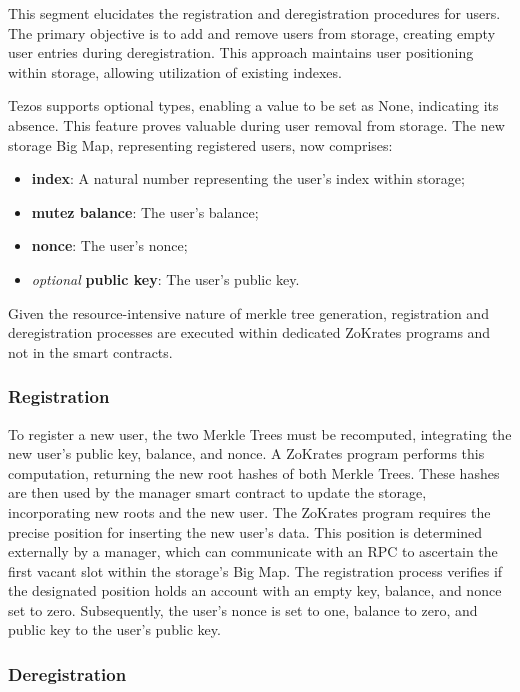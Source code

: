 This segment elucidates the registration and deregistration procedures for users. The primary objective is to add and remove users from storage, creating empty user entries during deregistration. This approach maintains user positioning within storage, allowing utilization of existing indexes.

Tezos supports optional types, enabling a value to be set as None, indicating its absence. This feature proves valuable during user removal from storage. The new storage Big Map, representing registered users, now comprises:
\begin{itemize}
	\item \textbf{index}: A natural number representing the user's index within storage;
	\item \textbf{mutez balance}: The user's balance;
	\item \textbf{nonce}: The user's nonce;
	\item \textit{optional} \textbf{public key}: The user's public key.
\end{itemize}

Given the resource-intensive nature of merkle tree generation, registration and deregistration processes are executed within dedicated ZoKrates programs and not in the smart contracts.

\subsubsection{Registration\label{subsec:registration}}

To register a new user, the two Merkle Trees must be recomputed, integrating the new user's public key, balance, and nonce. A ZoKrates program performs this computation, returning the new root hashes of both Merkle Trees. These hashes are then used by the manager smart contract to update the storage, incorporating new roots and the new user. The ZoKrates program requires the precise position for inserting the new user's data. This position is determined externally by a manager, which can communicate with an RPC to ascertain the first vacant slot within the storage's Big Map. The registration process verifies if the designated position holds an account with an empty key, balance, and nonce set to zero. Subsequently, the user's nonce is set to one, balance to zero, and public key to the user's public key.

\subsubsection{Deregistration}

